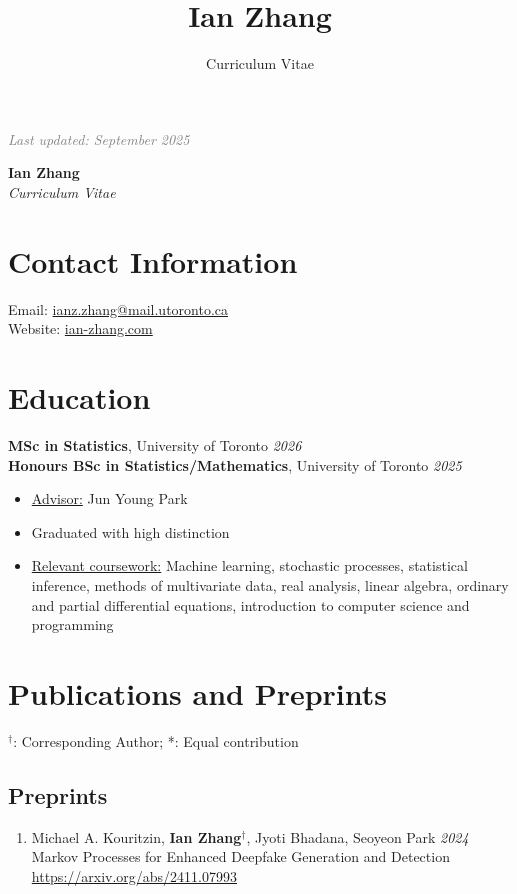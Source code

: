 \documentclass[11pt]{article}
\title{Ian Zhang}
\author{Curriculum Vitae}
\theoremstyle{definition}
\newcommand{\1}{\mathds 1}
\begin{document}
\sloppy
\hfill {\scriptsize\textit{\textcolor{gray}{Last updated: September 2025}}}
\begin{center}
    {\huge \textbf{Ian Zhang}}\\
    \textit{Curriculum Vitae}
\end{center}

\section*{Contact Information}
Email: \href{mailto:ianz.zhang@mail.utoronto.ca}{ianz.zhang@mail.utoronto.ca}\\
Website: \href{www.ian-zhang.com}{ian-zhang.com}

\section*{Education}
\textbf{MSc in Statistics}, University of Toronto \hfill \textit{2026}\\
\textbf{Honours BSc in Statistics/Mathematics}, University of Toronto \hfill \textit{2025}
\begin{itemize}[itemsep=2pt, parsep=0pt, topsep=0pt]
    \item \underline{Advisor:} Jun Young Park
    \item Graduated with high distinction
    \item \underline{Relevant coursework:} Machine learning, stochastic processes, statistical inference, methods of multivariate data, real analysis, linear algebra, ordinary and partial differential equations, introduction to computer science and programming
  \end{itemize}
  

\section*{Publications and Preprints}
{\small $^\dag$: Corresponding Author; \hspace{1cm} *: Equal contribution}
\subsection*{Preprints}
\begin{enumerate}
    \item Michael A. Kouritzin, \textbf{Ian Zhang}$^\dag$, Jyoti Bhadana, Seoyeon Park \hfill \textit{2024}\\
    Markov Processes for Enhanced Deepfake Generation and Detection \\
    \url{https://arxiv.org/abs/2411.07993}
\end{enumerate}
\end{document}
